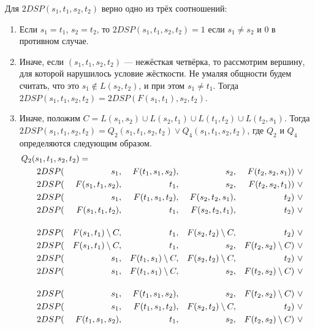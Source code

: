 \begin{theorem}
Для $2DSP(s_1, t_1, s_2, t_2)$ верно одно из трёх соотношений:
\begin{enumerate} 
\item Если $s_1 = t_1$, $s_2 = t_2$, то $2DSP(s_1, t_1, s_2, t_2) = 1$ если $s_1 \neq s_2$ и $0$ в противном случае.
\item Иначе, если $(s_1, t_1, s_2, t_2)$ --- нежёсткая четвёрка, то рассмотрим вершину, для которой нарушилось условие жёсткости. Не умаляя общности будем считать, что это $s_1 \notin L(s_2, t_2)$, и при этом $s_1 \neq t_1$. Тогда $2DSP(s_1, t_1, s_2, t_2) = 2DSP(F(s_1, t_1), s_2, t_2)$.
\item Иначе, положим $C = L(s_1, s_2) \cup L(s_2, t_1) \cup L(t_1, t_2) \cup L(t_2, s_1)$. Тогда $2DSP(s_1, t_1, s_2, t_2) = Q_2(s_1, t_1, s_2, t_2) \vee Q_4(s_1, t_1, s_2, t_2)$, где $Q_2$ и $Q_4$ определяются следующим образом.
\begin{align}
Q_2(s_1, t_1, s_2, t_2) =\hspace{-1cm}\\
    2DSP(&& s_1              ,&& F(t_1, s_1, s_2) ,&& s_2              ,&& F(t_2, s_2, s_1) &)~\vee \\
    2DSP(&& F(s_1, t_1, s_2) ,&& t_1              ,&& s_2              ,&& F(t_2, s_2, t_1) &)~\vee \\
    2DSP(&& s_1              ,&& F(t_1, s_1, t_2) ,&& F(s_2, t_2, s_1) ,&& t_2              &)~\vee \\
    2DSP(&& F(s_1, t_1, t_2) ,&& t_1              ,&& F(s_2, t_2, t_1) ,&& t_2              &)~\vee \\[0.4cm]
    2DSP(&& F(s_1, t_1) \sm C,&& t_1              ,&& F(s_2, t_2) \sm C,&& t_2              &)~\vee \\ 
    2DSP(&& F(s_1, t_1) \sm C,&& t_1              ,&& s_2              ,&& F(t_2, s_2) \sm C&)~\vee \\ 
    2DSP(&& s_1              ,&& F(t_1, s_1) \sm C,&& F(s_2, t_2) \sm C,&& t_2              &)~\vee \\ 
    2DSP(&& s_1              ,&& F(t_1, s_1) \sm C,&& s_2              ,&& F(t_2, s_2) \sm C&)~\vee \\[0.4cm]
    2DSP(&& s_1              ,&& F(t_1, s_1, s_2) ,&& s_2              ,&& F(t_2, s_2) \sm C&)~\vee \\
    2DSP(&& s_1              ,&& F(t_1, s_1, t_2) ,&& F(s_2, t_2) \sm C,&& t_2              &)~\vee \\
    2DSP(&& F(t_1, s_1, s_2) ,&& t_1              ,&& s_2              ,&& F(t_2, s_2) \sm C&)~\vee \\

\end{align}
\end{enumerate}
\end{theorem}

